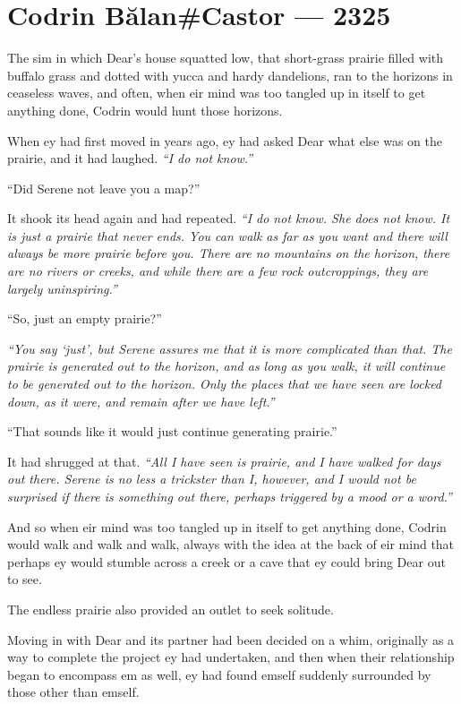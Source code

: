 \hypertarget{codrin-bux103lancastor-2325}{%
\chapter{Codrin Bălan\#Castor — 2325}\label{codrin-bux103lancastor-2325}}

The sim in which Dear's house squatted low, that short-grass prairie filled with buffalo grass and dotted with yucca and hardy dandelions, ran to the horizons in ceaseless waves, and often, when eir mind was too tangled up in itself to get anything done, Codrin would hunt those horizons.

When ey had first moved in years ago, ey had asked Dear what else was on the prairie, and it had laughed. \emph{``I do not know.''}

``Did Serene not leave you a map?''

It shook its head again and had repeated. \emph{``I do not know. She does not know. It is just a prairie that never ends. You can walk as far as you want and there will always be more prairie before you. There are no mountains on the horizon, there are no rivers or creeks, and while there are a few rock outcroppings, they are largely uninspiring.''}

``So, just an empty prairie?''

\emph{``You say `just', but Serene assures me that it is more complicated than that. The prairie is generated out to the horizon, and as long as you walk, it will continue to be generated out to the horizon. Only the places that we have seen are locked down, as it were, and remain after we have left.''}

``That sounds like it would just continue generating prairie.''

It had shrugged at that. \emph{``All I have seen is prairie, and I have walked for days out there. Serene is no less a trickster than I, however, and I would not be surprised if there is something out there, perhaps triggered by a mood or a word.''}

And so when eir mind was too tangled up in itself to get anything done, Codrin would walk and walk and walk, always with the idea at the back of eir mind that perhaps ey would stumble across a creek or a cave that ey could bring Dear out to see.

The endless prairie also provided an outlet to seek solitude.

Moving in with Dear and its partner had been decided on a whim, originally as a way to complete the project ey had undertaken, and then when their relationship began to encompass em as well, ey had found emself suddenly surrounded by those other than emself.

